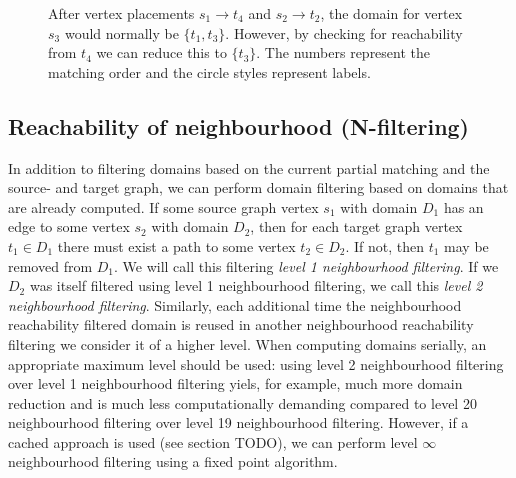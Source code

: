 \begin{figure}
\centering
\parbox{1.2in}{

}
\qquad\qquad
\begin{minipage}{1.2in}%

\end{minipage}
\caption{After vertex placements $s_1 \to t_4$ and $s_2 \to t_2$, the domain for vertex $s_3$ would normally be $\{t_1, t_3\}$. However, by checking for reachability from $t_4$ we can reduce this to $\{t_3\}$. The numbers represent the matching order and the circle styles represent labels.}
\label{fig:reachability-filtered}
\end{figure}
\subsection{Reachability of neighbourhood \hspace{12pt}(N-filtering)}
In addition to filtering domains based on the current partial matching and the source- and target graph, we can perform domain filtering based on domains that are already computed. If some source graph vertex $s_1$ with domain $D_1$ has an edge to some vertex $s_2$ with domain $D_2$, then for each target graph vertex $t_1 \in D_1$ there must exist a path to some vertex $t_2 \in D_2$. If not, then $t_1$ may be removed from $D_1$. We will call this filtering \textit{level 1 neighbourhood filtering}. If we $D_2$ was itself filtered using level 1 neighbourhood filtering, we call this \textit{level 2 neighbourhood filtering}. Similarly, each additional time the neighbourhood reachability filtered domain is reused in another neighbourhood reachability filtering we consider it of a higher level. When computing domains serially, an appropriate maximum level should be used: using level 2 neighbourhood filtering over level 1 neighbourhood filtering yiels, for example, much more domain reduction and is much less computationally demanding compared to level 20 neighbourhood filtering over level 19 neighbourhood filtering. However, if a cached approach is used (see section TODO), we can perform level $\infty$ neighbourhood filtering using a fixed point algorithm.

